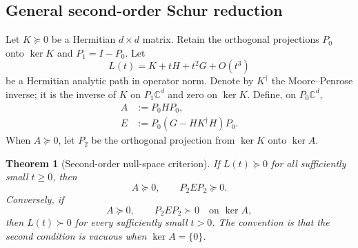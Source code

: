 \documentclass[11pt]{article}
\newtheorem{theorem}{Theorem}[section]
\theoremstyle{remark}
\begin{document}
\subsection{General second-order Schur reduction}

Let \(K\succeq0\) be a Hermitian \(d\times d\) matrix.  Retain the
orthogonal projections \(P_0\) onto \(\ker K\) and
\(P_1=I-P_0\).  Let
\begin{equation}
 L(t)=K+tH+t^2G+O(t^3)                            \tag{32.1}
\end{equation}
be a Hermitian analytic path in operator norm.  Denote by
\(K^\dagger\) the Moore--Penrose inverse; it is the inverse of \(K\)
on \(P_1\mathbb C^d\) and zero on \(\ker K\).  Define, on
\(P_0\mathbb C^d\),
\begin{align}
 A&:=P_0HP_0,                                    \tag{32.2}\\
 E&:=P_0(G-HK^\dagger H)P_0.                     \tag{32.3}
\end{align}
When \(A\succeq0\), let \(P_2\) be the orthogonal projection from
\(\ker K\) onto \(\ker A\).

\begin{theorem}[Second-order null-space criterion]
\label{thm:v12v32-second-order}
If \(L(t)\succeq0\) for all sufficiently small \(t\geq0\), then
\begin{equation}
 A\succeq0,\qquad P_2EP_2\succeq0.                \tag{32.4}
\end{equation}
Conversely, if
\begin{equation}
 A\succeq0,\qquad
 P_2EP_2\succ0\quad\text{on }\ker A,              \tag{32.5}
\end{equation}
then \(L(t)\succ0\) for every sufficiently small \(t>0\).
The convention is that the second condition is vacuous when
\(\ker A=\{0\}\).
\end{theorem}
\end{document}
